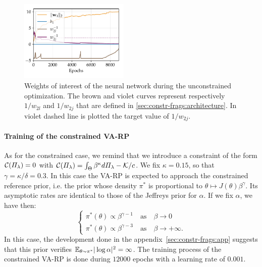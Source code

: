 \begin{figure}[h]
    \centering
    \includegraphics[width=5.2cm]{figures/constr-frags/weights_unconstr.pdf}
    \caption{
        Weights of interest of the neural network during the unconstrained optimization. %
    The brown and violet curves represent respectively $1/w_{2l}$ and $1/w_{2j}$ that are defined in \cref{sec:constr-frags:architecture}. In violet dashed line is plotted the target value of $1/w_{2j}$. %
    }
    \label{fig:unconstr_weights}
\end{figure}



\paragraph{Training of the constrained VA-RP}
As for the constrained case, we remind that we introduce a constraint of the form $\mathcal{C}(\varPi_\lambda)=0$ with  $\mathcal{C}(\varPi_\lambda) = \int_\Theta \beta^\kappa d\varPi_\lambda - \mathcal{K}/c$.
We fix $\kappa=0.15$, so that $\gamma=\kappa/\delta=0.3$.
In this case the VA-RP is expected to approach the constrained reference prior, i.e. the prior whose density  $\pi^\ast$ is proportional to $\theta\mapsto J(\theta)\beta^\gamma$.
Its asymptotic rates are identical to those of the Jeffreys prior for $\alpha$. If we fix $\alpha$, we have then:
\begin{equation} 
\begin{cases} \displaystyle
\pi^\ast(\theta) \propto \beta^{\gamma -1} \quad \text{as} \quad  \beta \longrightarrow 0 \\
\pi^\ast(\theta) \propto \beta^{\gamma - 3} \quad \text{as} \quad  \beta \longrightarrow +\infty.
\end{cases} 
\end{equation} 
In this case, the development done in the appendix~\ref{sec:constr-frags:app} suggests that this prior verifies $\mathbb{E}_{\theta\sim\pi^\ast}|\log\alpha|^2=\infty$.
The training process of the constrained VA-RP is done during $12000$ epochs with a learning rate of $0.001$. %



